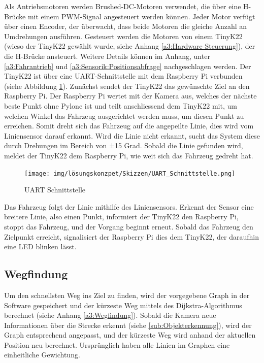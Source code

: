 \documentclass[../main.tex]{subfiles}
\begin{document}
Als Antriebsmotoren werden Brushed-DC-Motoren verwendet, die über eine H-Brücke mit einem PWM-Signal angesteuert werden können. Jeder Motor verfügt über einen Encoder, der überwacht, dass beide Motoren die gleiche Anzahl an Umdrehungen ausführen. Gesteuert werden die Motoren von einem TinyK22 (wieso der TinyK22 gewählt wurde, siehe Anhang \ref{a3:Hardware Steuerung}), der die H-Brücke ansteuert. Weitere Details können im Anhang, unter \ref{a3:Fahrantrieb} und \ref{a3:Sensorik:Positionsabfrage} nachgeschlagen werden.
\newpage
Der TinyK22 ist über eine UART-Schnittstelle mit dem Raspberry Pi verbunden (siehe Abbildung \ref{img:UART_Schnittstelle}). Zunächst sendet der TinyK22 das gewünschte Ziel an den Raspberry Pi. Der Raspberry Pi wertet mit der Kamera aus, welches der nächste beste Punkt ohne Pylone ist und teilt anschliessend dem TinyK22 mit, um welchen Winkel das Fahrzeug ausgerichtet werden muss, um diesen Punkt zu erreichen. Somit dreht sich das Fahrzeug auf die angepeilte Linie, dies wird vom Liniensensor darauf erkannt. Wird die Linie nicht erkannt, sucht das System diese durch Drehungen im Bereich von ±15 Grad. Sobald die Linie gefunden wird, meldet der TinyK22 dem Raspberry Pi, wie weit sich das Fahrzeug gedreht hat.

\begin{figure}[H]
\centering
\texttt{[image: img/lösungskonzpet/Skizzen/UART\_Schnittstelle.png]}
\caption{UART Schnittstelle}
\label{img:UART_Schnittstelle}
\end{figure}

Das Fahrzeug folgt der Linie mithilfe des Liniensensors. Erkennt der Sensor eine breitere Linie, also einen Punkt, informiert der TinyK22 den Raspberry Pi, stoppt das Fahrzeug, und der Vorgang beginnt erneut. Sobald das Fahrzeug den Zielpunkt erreicht, signalisiert der Raspberry Pi dies dem TinyK22, der daraufhin eine LED blinken lässt.

\newpage

\subsection{Wegfindung}

Um den schnellsten Weg ins Ziel zu finden, wird der vorgegebene Graph in der Software gespeichert und der kürzeste Weg mittels des Dijkstra-Algorithmus berechnet (siehe Anhang \ref{a3:Wegfindung}). Sobald die Kamera neue Informationen über die Strecke erkennt (siehe \ref{sub:Objekterkennung}), wird der Graph entsprechend angepasst, und der kürzeste Weg wird anhand der aktuellen Position neu berechnet. Ursprünglich haben alle Linien im Graphen eine einheitliche Gewichtung.
\end{document}
